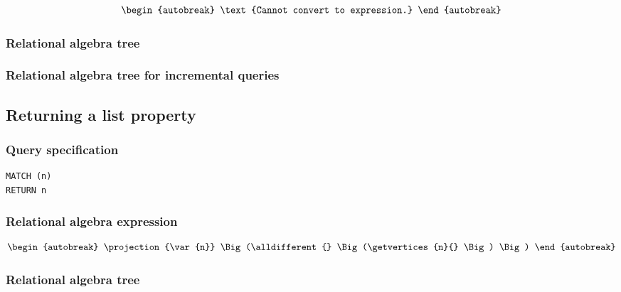 \begin{align*}
\begin{autobreak}
\text{Cannot convert to expression.}
\end{autobreak}
\end{align*}

\subsubsection*{Relational algebra tree}


\subsubsection*{Relational algebra tree for incremental queries}


\subsection{Returning a list property}

\subsubsection*{Query specification}

\begin{lstlisting}
MATCH (n)
RETURN n
\end{lstlisting}

\subsubsection*{Relational algebra expression}

\begin{align*}
\begin{autobreak}
\projection{\var{n}} \Big(\alldifferent{} \Big(\getvertices{n}{}
\Big)
\Big)
\end{autobreak}
\end{align*}

\subsubsection*{Relational algebra tree}


